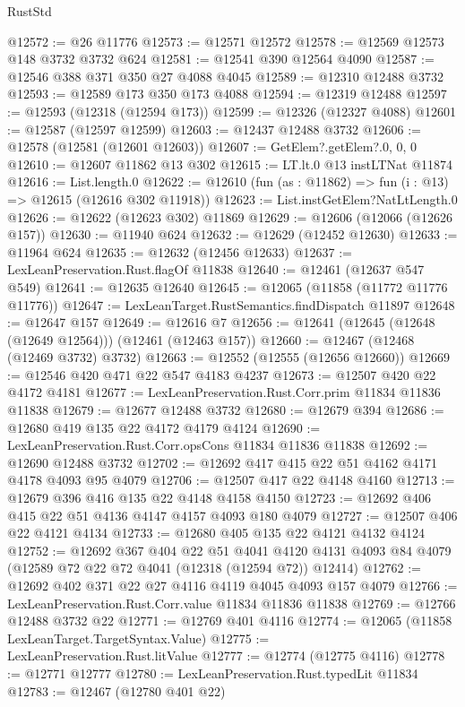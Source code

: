 \begin{lexlean}{RustStd}
\begin{coremodule}
@12572 := @26 @11776
@12573 := @12571 @12572
@12578 := @12569 @12573 @148 @3732 @3732 @624
@12581 := @12541 @390 @12564 @4090
@12587 := @12546 @388 @371 @350 @27 @4088 @4045
@12589 := @12310 @12488 @3732
@12593 := @12589 @173 @350 @173 @4088
@12594 := @12319 @12488
@12597 := @12593 (@12318 (@12594 @173))
@12599 := @12326 (@12327 @4088)
@12601 := @12587 (@12597 @12599)
@12603 := @12437 @12488 @3732
@12606 := @12578 (@12581 (@12601 @12603))
@12607 := GetElem?.getElem?.{0, 0, 0}
@12610 := @12607 @11862 @13 @302
@12615 := LT.lt.{0} @13 instLTNat @11874
@12616 := List.length.{0}
@12622 := @12610 (fun (as : @11862) => fun (i : @13) => @12615 (@12616 @302 @11918))
@12623 := List.instGetElem?NatLtLength.{0}
@12626 := @12622 (@12623 @302) @11869
@12629 := @12606 (@12066 (@12626 @157))
@12630 := @11940 @624
@12632 := @12629 (@12452 @12630)
@12633 := @11964 @624
@12635 := @12632 (@12456 @12633)
@12637 := LexLeanPreservation.Rust.flagOf @11838
@12640 := @12461 (@12637 @547 @549)
@12641 := @12635 @12640
@12645 := @12065 (@11858 (@11772 @11776 @11776))
@12647 := LexLeanTarget.RustSemantics.findDispatch @11897
@12648 := @12647 @157
@12649 := @12616 @7
@12656 := @12641 (@12645 (@12648 (@12649 @12564))) (@12461 (@12463 @157))
@12660 := @12467 (@12468 (@12469 @3732) @3732)
@12663 := @12552 (@12555 (@12656 @12660))
@12669 := @12546 @420 @471 @22 @547 @4183 @4237
@12673 := @12507 @420 @22 @4172 @4181
@12677 := LexLeanPreservation.Rust.Corr.prim @11834 @11836 @11838
@12679 := @12677 @12488 @3732
@12680 := @12679 @394
@12686 := @12680 @419 @135 @22 @4172 @4179 @4124
@12690 := LexLeanPreservation.Rust.Corr.opsCons @11834 @11836 @11838
@12692 := @12690 @12488 @3732
@12702 := @12692 @417 @415 @22 @51 @4162 @4171 @4178 @4093 @95 @4079
@12706 := @12507 @417 @22 @4148 @4160
@12713 := @12679 @396 @416 @135 @22 @4148 @4158 @4150
@12723 := @12692 @406 @415 @22 @51 @4136 @4147 @4157 @4093 @180 @4079
@12727 := @12507 @406 @22 @4121 @4134
@12733 := @12680 @405 @135 @22 @4121 @4132 @4124
@12752 := @12692
    @367
    @404
    @22
    @51
    @4041
    @4120
    @4131
    @4093
    @84
    @4079
    (@12589 @72 @22 @72 @4041 (@12318 (@12594 @72)) @12414)
@12762 := @12692 @402 @371 @22 @27 @4116 @4119 @4045 @4093 @157 @4079
@12766 := LexLeanPreservation.Rust.Corr.value @11834 @11836 @11838
@12769 := @12766 @12488 @3732 @22
@12771 := @12769 @401 @4116
@12774 := @12065 (@11858 LexLeanTarget.TargetSyntax.Value)
@12775 := LexLeanPreservation.Rust.litValue
@12777 := @12774 (@12775 @4116)
@12778 := @12771 @12777
@12780 := LexLeanPreservation.Rust.typedLit @11834
@12783 := @12467 (@12780 @401 @22)

\end{coremodule}
\end{lexlean}
